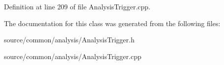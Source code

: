 Definition at line 209 of file Analysis\-Trigger.\-cpp.



The documentation for this class was generated from the following files\-:\begin{DoxyCompactItemize}
\item 
source/common/analysis/Analysis\-Trigger.\-h\item 
source/common/analysis/Analysis\-Trigger.\-cpp\end{DoxyCompactItemize}
